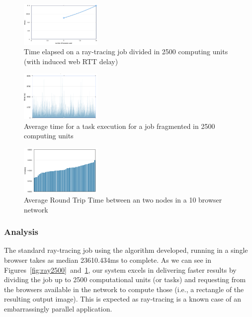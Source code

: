 \begin{figure}[h!]
  \centering
  \includegraphics[width=0.35\textwidth]{figs/3.png}
  \caption{Time elapsed on a ray-tracing job divided in 2500 computing units (with induced web RTT delay)}
  \label{fig:ray2500time}
\end{figure}



\begin{figure}[h!]
  \centering
  \includegraphics[width=0.35\textwidth]{figs/avg_time_exec.png}
  \caption{Average time for a task execution for a job fragmented in 2500 computing units}
  \label{fig:avgtimeexec}
\end{figure}

\begin{figure}[h!]
  \centering
  \includegraphics[width=0.35\textwidth]{figs/rtt.png}
  \caption{Average Round Trip Time between an two nodes in a 10 browser network}
  \label{fig:rtt}
\end{figure}

\subsubsection{Analysis}

The standard ray-tracing job using the algorithm developed, running in a single browser takes as median 23610.434ms to complete. As we can see in Figures~\ref{fig:ray2500}~and~\ref{fig:ray2500time}, our system excels in delivering faster results by dividing the job up to 2500 computational units (or tasks) and requesting from the browsers available in the network to compute those (i.e., a rectangle of the resulting output image). This is expected as ray-tracing is a known case of an embarrassingly parallel application.

